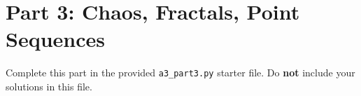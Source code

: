 \documentclass[11pt]{article}
\begin{document}
\section*{Part 3: Chaos, Fractals, Point Sequences}

Complete this part in the provided \texttt{a3\_part3.py} starter file.
Do \textbf{not} include your solutions in this file.
\end{document}
